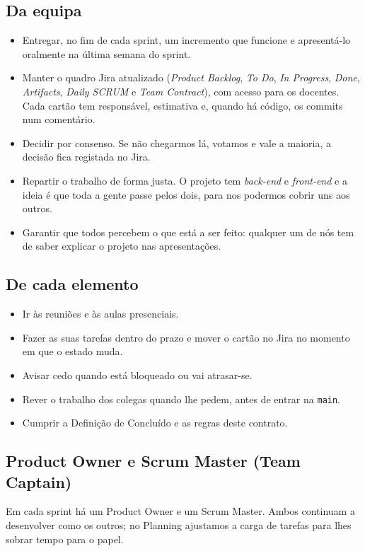 \documentclass[11pt,a4paper]{article}
\begin{document}
\subsection{Da equipa}

\begin{itemize}
  \item Entregar, no fim de cada sprint, um incremento que funcione e apresentá-lo oralmente na última semana do sprint.
  \item Manter o quadro Jira atualizado (\textit{Product Backlog}, \textit{To Do}, \textit{In Progress}, \textit{Done}, \textit{Artifacts}, \textit{Daily SCRUM} e \textit{Team Contract}), com acesso para os docentes. Cada cartão tem responsável, estimativa e, quando há código, os commits num comentário.
  \item Decidir por consenso. Se não chegarmos lá, votamos e vale a maioria, a decisão fica registada no Jira.
  \item Repartir o trabalho de forma justa. O projeto tem \textit{back-end} e \textit{front-end} e a ideia é que toda a gente passe pelos dois, para nos podermos cobrir uns aos outros.
  \item Garantir que todos percebem o que está a ser feito: qualquer um de nós tem de saber explicar o projeto nas apresentações.
\end{itemize}

\subsection{De cada elemento}

\begin{itemize}
  \item Ir às reuniões e às aulas presenciais.
  \item Fazer as suas tarefas dentro do prazo e mover o cartão no Jira no momento em que o estado muda.
  \item Avisar cedo quando está bloqueado ou vai atrasar-se.
  \item Rever o trabalho dos colegas quando lhe pedem, antes de entrar na \texttt{main}.
  \item Cumprir a Definição de Concluído e as regras deste contrato.
\end{itemize}

\subsection{Product Owner e Scrum Master (Team Captain)}
Em cada sprint há um Product Owner e um Scrum Master. Ambos continuam a desenvolver como os outros; no Planning ajustamos a carga de tarefas para lhes sobrar tempo para o papel.
\end{document}
